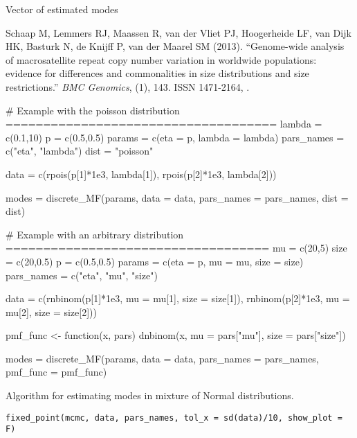 \documentclass[a4paper]{book}
\begin{document}
%
\begin{Value}
Vector of estimated modes
\end{Value}
%
\begin{References}\relax
Schaap M, Lemmers RJ, Maassen R, van der Vliet PJ, Hoogerheide LF, van Dijk HK, Basturk N, de Knijff P, van der Maarel SM (2013).
``Genome-wide analysis of macrosatellite repeat copy number variation in worldwide populations: evidence for differences and commonalities in size distributions and size restrictions.''
\emph{BMC Genomics}, (1), 143.
ISSN 1471-2164, .
\end{References}
%
\begin{Examples}
\begin{ExampleCode}
# Example with the poisson distribution ====================================
lambda = c(0.1,10)
p = c(0.5,0.5)
params = c(eta = p, lambda = lambda)
pars_names = c("eta", "lambda")
dist = "poisson"

data = c(rpois(p[1]*1e3, lambda[1]),
         rpois(p[2]*1e3, lambda[2]))

modes = discrete_MF(params, data = data, pars_names = pars_names, dist = dist)

# Example with an arbitrary distribution ===================================
mu = c(20,5)
size = c(20,0.5)
p = c(0.5,0.5)
params = c(eta = p, mu = mu, size = size)
pars_names = c("eta", "mu", "size")

data = c(rnbinom(p[1]*1e3, mu = mu[1], size = size[1]),
         rnbinom(p[2]*1e3, mu = mu[2], size = size[2]))

pmf_func <- function(x, pars) {
  dnbinom(x, mu = pars["mu"], size = pars["size"])
}

modes = discrete_MF(params, data = data, pars_names = pars_names, pmf_func = pmf_func)

\end{ExampleCode}
\end{Examples}
%
\begin{Description}\relax
Algorithm for estimating modes in mixture of Normal distributions.
\end{Description}
%
\begin{Usage}
\begin{verbatim}
fixed_point(mcmc, data, pars_names, tol_x = sd(data)/10, show_plot = F)
\end{verbatim}
\end{Usage}
\end{document}
